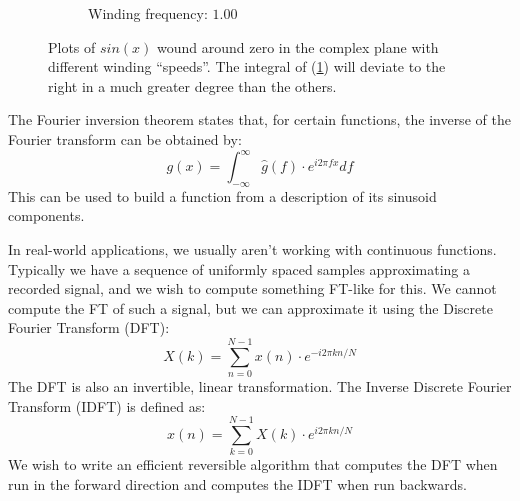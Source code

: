 \begin{figure}
\begin{subfigure}[b]{0.45\textwidth}
    \caption{Winding frequency: $1.00$\label{fig:windingd}}
    \end{subfigure}
    \caption{Plots of $sin(x)$ wound around zero in the complex plane with different winding ``speeds''.
    The integral of (\ref{fig:windingd}) will deviate to the right in a much greater degree than the others.
    \label{fig:winding}}
\end{figure}

The Fourier inversion theorem states that,
for certain functions,
the inverse of the Fourier transform can be obtained by:
\begin{equation}
     g(x) = \int_{-\infty}^{\infty} \hat g(f) \cdot e^{i 2 \pi f x} df
\end{equation}
This can be used to build a function from a description of its sinusoid components.

In real-world applications, we usually aren't working with continuous functions.
Typically we have a sequence of uniformly spaced samples approximating a recorded signal,
and we wish to compute something FT-like for this.
We cannot compute the FT of such a signal,
but we can approximate it using the Discrete Fourier Transform (DFT):
%
\begin{equation}
    X(k) = \sum_{n = 0}^{N - 1} x(n) \cdot e^{-i 2 \pi kn / N}
\end{equation}
%
The DFT is also an invertible, linear transformation.
The Inverse Discrete Fourier Transform (IDFT) is defined as:
\begin{equation}
    x(n) = \sum_{k = 0}^{N - 1} X(k) \cdot e^{i 2 \pi kn / N}
\end{equation}
%
We wish to write an efficient reversible algorithm
that computes the DFT when run in the forward direction
and computes the IDFT when run backwards.

